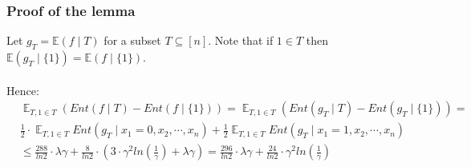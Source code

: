 \documentclass{article}
\begin{document}
				 \subsubsection{Proof of the lemma}
				 	Let $g_T = \mathbb{E} \left( f \mid T \right)$ for a subset $T \subseteq [n]$. Note that if $1 \in T$ then $ \mathbb{E} \left( g_T \mid \{1\} \right) =  \mathbb{E} \left( f \mid \{1\} \right) $. 
				 	
				 	\paragraph{}
				 	Hence:
				 	\begin{equation} \begin{aligned}
				 		& \mathop{\mathbb{E}}_{T,1 \in T} \left( Ent \left( f \mid T \right) - Ent \left( f \mid \{1\} \right) \right) =
				 		\mathop{\mathbb{E}}_{T,1 \in T} \left( Ent \left( g_T \mid T \right) - Ent \left( g_T \mid \{1\} \right) \right) = \\
				 		& \frac{1}{2} \cdot \mathop{\mathbb{E}}_{T,1 \in T} Ent \left( g_T \mid x_1 = 0,x_2, \cdots, x_n \right) + \frac{1}{2} \mathop{\mathbb{E}}_{T,1 \in T} Ent \left( g_T \mid x_1 = 1,x_2, \cdots, x_n \right) \\
				 		& \leq \frac{288}{ln2} \cdot \lambda \gamma + \frac{8}{ln2} \cdot \left( 3 \cdot \gamma^2 ln \left( \frac{1}{\gamma} \right) + \lambda \gamma  \right)
				 		= \frac{296}{ln2} \cdot \lambda \gamma +\frac{24}{ln2} \cdot \gamma^2 ln \left( \frac{1}{\gamma} \right) 
				 	\end{aligned} 
				 	\end{equation}
				 
\end{document}
